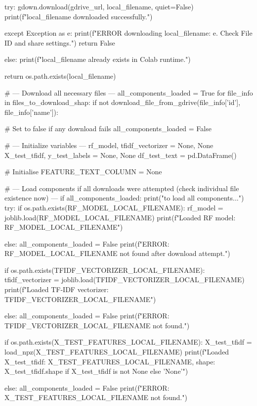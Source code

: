 \begin{ffcode}
        try:
            gdown.download(gdrive_url, local_filename, quiet=False)
            print(f"{local_filename} downloaded successfully.")

        except Exception as e:
            print(f"ERROR downloading {local_filename}: {e}. Check File ID and share settings.")
            return False

    else:
        print(f"{local_filename} already exists in Colab runtime.")

    return os.path.exists(local_filename)

# --- Download all necessary files ---
all_components_loaded = True
for file_info in files_to_download_shap:
    if not download_file_from_gdrive(file_info['id'], file_info['name']):

        # Set to false if any download fails
        all_components_loaded = False

# --- Initialize variables ---
rf_model, tfidf_vectorizer = None, None
X_test_tfidf, y_test_labels = None, None
df_test_text = pd.DataFrame()

# Initialise
FEATURE_TEXT_COLUMN = None

# --- Load components if all downloads were attempted (check individual file existence now) ---
if all_components_loaded:
    print("\nAttempting to load all components...")
    try:
        if os.path.exists(RF_MODEL_LOCAL_FILENAME):
            rf_model = joblib.load(RF_MODEL_LOCAL_FILENAME)
            print(f"Loaded RF model: {RF_MODEL_LOCAL_FILENAME}")

        else:
        all_components_loaded = False
        print(f"ERROR: {RF_MODEL_LOCAL_FILENAME} not found after download attempt.")

        if os.path.exists(TFIDF_VECTORIZER_LOCAL_FILENAME):
            tfidf_vectorizer = joblib.load(TFIDF_VECTORIZER_LOCAL_FILENAME)
            print(f"Loaded TF-IDF vectorizer: {TFIDF_VECTORIZER_LOCAL_FILENAME}")

        else:
        all_components_loaded = False
        print(f"ERROR: {TFIDF_VECTORIZER_LOCAL_FILENAME} not found.")

        if os.path.exists(X_TEST_FEATURES_LOCAL_FILENAME):
            X_test_tfidf = load_npz(X_TEST_FEATURES_LOCAL_FILENAME)
            print(f"Loaded X_test_tfidf: {X_TEST_FEATURES_LOCAL_FILENAME}, shape: {X_test_tfidf.shape if X_test_tfidf is not None else 'None'}")

        else:
        all_components_loaded = False
        print(f"ERROR: {X_TEST_FEATURES_LOCAL_FILENAME} not found.")


\end{ffcode}
